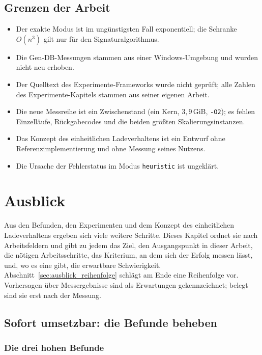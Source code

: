 \section{Grenzen der Arbeit}

\begin{itemize}
	\item Der exakte Modus ist im ungünstigsten Fall exponentiell; die Schranke $O(n^3)$ gilt nur für den Signaturalgorithmus.
	\item Die Gen-DB-Messungen stammen aus einer Windows-Umgebung und wurden nicht neu erhoben.
	\item Der Quelltext des Experimente-Frameworks wurde nicht geprüft; alle Zahlen des Experimente-Kapitels stammen aus seiner eigenen Arbeit.
	\item Die neue Messreihe ist ein Zwischenstand (ein Kern, $3{,}9$\,GiB, \texttt{-O2}); es fehlen Einzelläufe, Rückgabecodes und die beiden größten Skalierungsinstanzen.
	\item Das Konzept des einheitlichen Ladeverhaltens ist ein Entwurf ohne Referenzimplementierung und ohne Messung seines Nutzens.
	\item Die Ursache der Fehlerstatus im Modus \texttt{heuristic} ist ungeklärt.
\end{itemize}

\chapter{Ausblick}
\label{chap:ausblick}

Aus den Befunden, den Experimenten und dem Konzept des einheitlichen Ladeverhaltens ergeben sich viele weitere Schritte. Dieses Kapitel ordnet sie nach Arbeitsfeldern und gibt zu jedem das Ziel, den Ausgangspunkt in dieser Arbeit, die nötigen Arbeitsschritte, das Kriterium, an dem sich der Erfolg messen lässt, und, wo es eine gibt, die erwartbare Schwierigkeit. Abschnitt~\ref{sec:ausblick_reihenfolge} schlägt am Ende eine Reihenfolge vor. Vorhersagen über Messergebnisse sind als Erwartungen gekennzeichnet; belegt sind sie erst nach der Messung.

\section{Sofort umsetzbar: die Befunde beheben}

\subsection{Die drei hohen Befunde}


